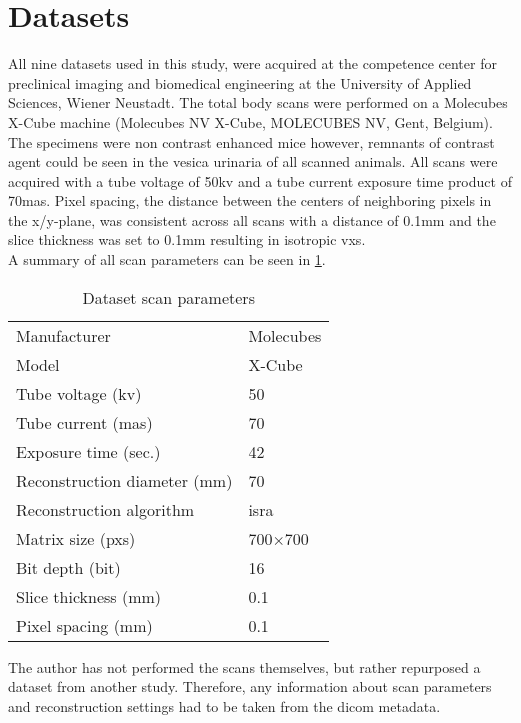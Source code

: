 \section{Datasets}\label{s:datasets}
All nine datasets used in this study, were acquired at the competence center for preclinical imaging and biomedical engineering at the University of Applied Sciences, Wiener Neustadt.
The total body scans were performed on a Molecubes X-Cube \mct\space machine (Molecubes NV X-Cube, MOLECUBES NV, Gent, Belgium).
The specimens were non contrast enhanced mice however, remnants of contrast agent could be seen in the vesica urinaria of all scanned animals.
All scans were acquired with a tube voltage of 50\acrshort{kv} and a tube current exposure time product of 70\acrshort{mas}.
Pixel spacing, the distance between the centers of neighboring pixels in the x/y-plane, was consistent across all scans with a distance of 0.1mm and the slice thickness was set to 0.1mm resulting in isotropic \glspl{vx}.\\
A summary of all scan parameters can be seen in \cref{tab:scan-parameters}.
\begin{table}
	\begin{center}
		\begin{tabular}{l l}
			Manufacturer                  & Molecubes      \\
			Model                         & X-Cube         \\
			Tube voltage (\acrshort{kv})  & 50             \\
			Tube current (\acrshort{mas}) & 70             \\
			Exposure time (sec.)          & 42             \\
			Reconstruction diameter (mm)  & 70             \\
			Reconstruction algorithm      & \gls{isra}     \\
			Matrix size (\glspl{px})      & 700$\times$700 \\
			Bit depth (\gls{bit})         & 16             \\
			Slice thickness (mm)          & 0.1            \\
			Pixel spacing (mm)            & 0.1            \\
		\end{tabular}
		\caption{Dataset scan parameters}\label{tab:scan-parameters}
	\end{center}
\end{table}
\noindent
The author has not performed the scans themselves, but rather repurposed a dataset from another study.
Therefore, any information about scan parameters and reconstruction settings had to be taken from the \gls{dicom} metadata.


